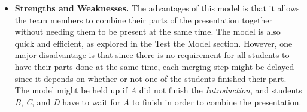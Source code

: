 \documentclass[12pt]{article}
\begin{document}
\begin{itemize}
\item \textbf{Strengths and Weaknesses.} The advantages of this model is that it allows the team members to combine their parts of the presentation together without needing them to be present at the same time. The model is also quick and efficient, as explored in the Test the Model section. However, one major disadvantage is that since there is no requirement for all students to have their parts done at the same time, each merging step might be delayed since it depends on whether or not one of the students finished their part. The model might be held up if \emph{A} did not finish the \emph{Introduction}, and students \emph{B}, \emph{C}, and \emph{D} have to wait for \emph{A} to finish in order to combine the presentation.
\end{itemize}
\end{document}
